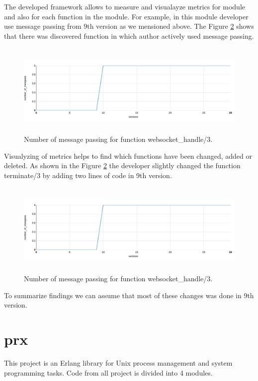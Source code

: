 The developed framework allows to measure and visualayze metrics for module and also for each function in the module. For example, in this module developer use message passing from 9th version as we mensioned above. The Figure \ref{fig:chat3} shows that there was discovered function in which author actively used message passing.

\begin{figure}[h]
	\centering
	\includegraphics[height=45mm]{figures/chat3.png}
	\caption{
	Number of message passing for function websocket\_handle/3.}
	\label{fig:chat3}
\end{figure}

Visualyzing of metrics helps to find which functions have been changed, added or deleted. As shown in the Figure \ref{fig:chat3} the developer slightly changed the function terminate/3 by adding two lines of code in 9th version.
\begin{figure}[h]
	\centering
	\includegraphics[height=45mm]{figures/chat3.png}
	\caption{
		Number of message passing for function websocket\_handle/3.}
	\label{fig:chat3}
\end{figure}
 
To summarize findings we can assume that most of these changes was done in 9th version.

\section{prx}

This project is an Erlang library for Unix process management and system programming tasks. Code from all project is divided into 4 modules. 

